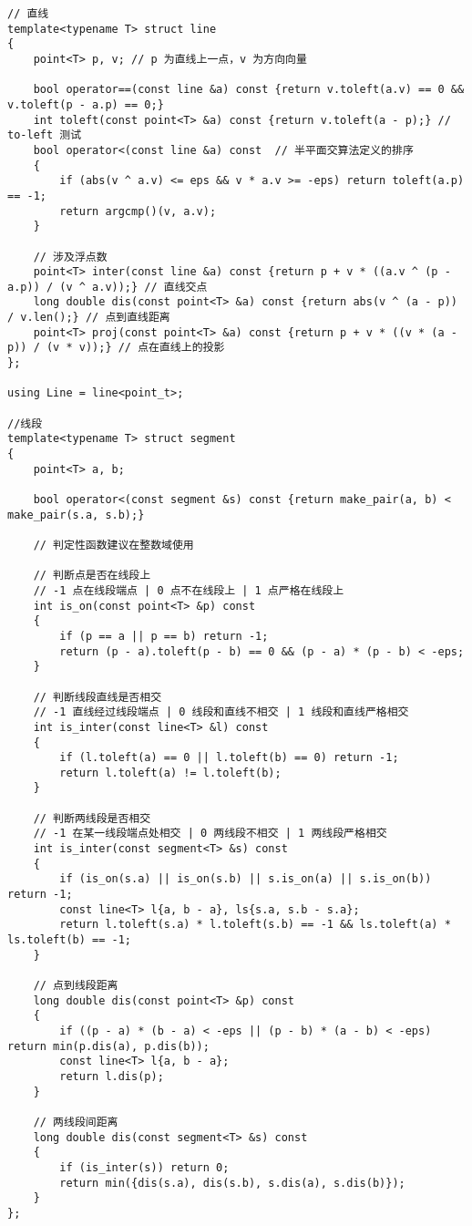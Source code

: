 \documentclass[a4paper,10pt]{article}
\begin{document}
\begin{lstlisting}
// 直线
template<typename T> struct line
{
    point<T> p, v; // p 为直线上一点，v 为方向向量

    bool operator==(const line &a) const {return v.toleft(a.v) == 0 && v.toleft(p - a.p) == 0;}
    int toleft(const point<T> &a) const {return v.toleft(a - p);} // to-left 测试
    bool operator<(const line &a) const  // 半平面交算法定义的排序
    {
        if (abs(v ^ a.v) <= eps && v * a.v >= -eps) return toleft(a.p) == -1;
        return argcmp()(v, a.v);
    }

    // 涉及浮点数
    point<T> inter(const line &a) const {return p + v * ((a.v ^ (p - a.p)) / (v ^ a.v));} // 直线交点
    long double dis(const point<T> &a) const {return abs(v ^ (a - p)) / v.len();} // 点到直线距离
    point<T> proj(const point<T> &a) const {return p + v * ((v * (a - p)) / (v * v));} // 点在直线上的投影
};

using Line = line<point_t>;

//线段
template<typename T> struct segment
{
    point<T> a, b;

    bool operator<(const segment &s) const {return make_pair(a, b) < make_pair(s.a, s.b);}

    // 判定性函数建议在整数域使用

    // 判断点是否在线段上
    // -1 点在线段端点 | 0 点不在线段上 | 1 点严格在线段上
    int is_on(const point<T> &p) const
    {
        if (p == a || p == b) return -1;
        return (p - a).toleft(p - b) == 0 && (p - a) * (p - b) < -eps;
    }

    // 判断线段直线是否相交
    // -1 直线经过线段端点 | 0 线段和直线不相交 | 1 线段和直线严格相交
    int is_inter(const line<T> &l) const
    {
        if (l.toleft(a) == 0 || l.toleft(b) == 0) return -1;
        return l.toleft(a) != l.toleft(b);
    }

    // 判断两线段是否相交
    // -1 在某一线段端点处相交 | 0 两线段不相交 | 1 两线段严格相交
    int is_inter(const segment<T> &s) const
    {
        if (is_on(s.a) || is_on(s.b) || s.is_on(a) || s.is_on(b)) return -1;
        const line<T> l{a, b - a}, ls{s.a, s.b - s.a};
        return l.toleft(s.a) * l.toleft(s.b) == -1 && ls.toleft(a) * ls.toleft(b) == -1;
    }

    // 点到线段距离
    long double dis(const point<T> &p) const
    {
        if ((p - a) * (b - a) < -eps || (p - b) * (a - b) < -eps) return min(p.dis(a), p.dis(b));
        const line<T> l{a, b - a};
        return l.dis(p);
    }

    // 两线段间距离
    long double dis(const segment<T> &s) const
    {
        if (is_inter(s)) return 0;
        return min({dis(s.a), dis(s.b), s.dis(a), s.dis(b)});
    }
};


\end{lstlisting}
\end{document}
